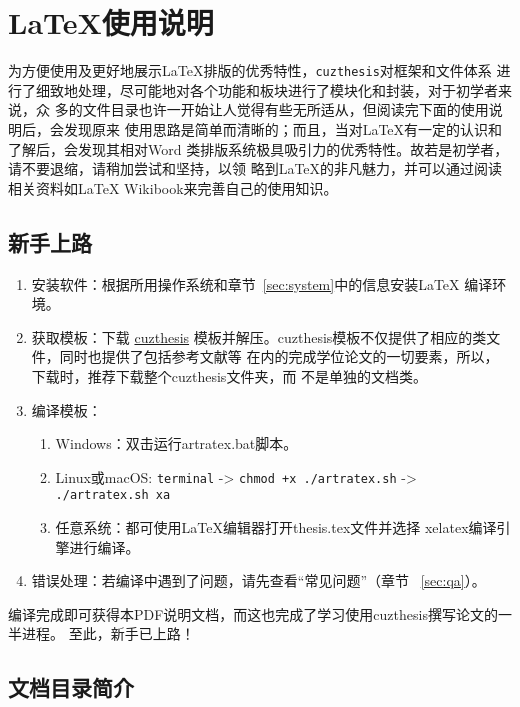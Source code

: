 \chapter{\LaTeX{}使用说明}\label{chap:guide}

为方便使用及更好地展示\LaTeX{}排版的优秀特性，\texttt{cuzthesis}对框架和文件体系
进行了细致地处理，尽可能地对各个功能和板块进行了模块化和封装，对于初学者来说，众
多的文件目录也许一开始让人觉得有些无所适从，但阅读完下面的使用说明后，会发现原来
使用思路是简单而清晰的；而且，当对\LaTeX{}有一定的认识和了解后，会发现其相对Word
类排版系统极具吸引力的优秀特性。故若是初学者，请不要退缩，请稍加尝试和坚持，以领
略到\LaTeX{}的非凡魅力，并可以通过阅读相关资料如\LaTeX{}
Wikibook\citep{wikibook2014latex}来完善自己的使用知识。

\section{新手上路}

\begin{enumerate}
    \item 安装软件：根据所用操作系统和章节~\ref{sec:system}中的信息安装\LaTeX{}
    编译环境。
    \item 获取模板：下载 \href{https://github.com/xiehao/CUZThesis}{cuzthesis}
    模板并解压。cuzthesis模板不仅提供了相应的类文件，同时也提供了包括参考文献等
    在内的完成学位论文的一切要素，所以，下载时，推荐下载整个cuzthesis文件夹，而
    不是单独的文档类。
    \item 编译模板：
        \begin{enumerate}
            \item Windows：双击运行artratex.bat脚本。
            \item Linux或macOS: {\scriptsize \verb|terminal| -> \verb|chmod +x ./artratex.sh| -> \verb|./artratex.sh xa|}
            \item 任意系统：都可使用\LaTeX{}编辑器打开thesis.tex文件并选择
            xelatex编译引擎进行编译。
        \end{enumerate}
    \item 错误处理：若编译中遇到了问题，请先查看“常见问题”（章节
    ~\ref{sec:qa}）。
\end{enumerate}

编译完成即可获得本PDF说明文档，而这也完成了学习使用cuzthesis撰写论文的一半进程。
至此，新手已上路！

\section{文档目录简介}

